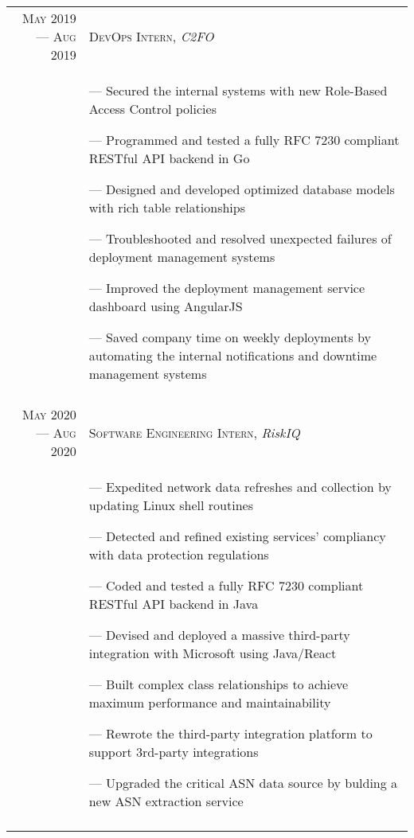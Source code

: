 \documentclass[a4paper, 10pt]{article}
\begin{document}
\begin{tabular}{r|p{12cm}}

	\textsc{May 2019 --- Aug 2019} & \textsc{DevOps Intern}, \emph{C2FO}                                                         \\&\footnotesize{
		--- Secured the internal systems with new Role-Based Access Control policies

		--- Programmed and tested a fully RFC 7230 compliant RESTful API backend in Go

		--- Designed and developed optimized database models with rich table relationships

		--- Troubleshooted and resolved unexpected failures of deployment management systems

		--- Improved the deployment management service dashboard using AngularJS

		--- Saved company time on weekly deployments by automating the internal notifications and downtime management systems
	}                                                                                                                            \\\multicolumn{2}{c}{}\\

	\textsc{May 2020 --- Aug 2020} & \textsc{Software Engineering Intern}, \emph{RiskIQ}                                         \\&\footnotesize{
		--- Expedited network data refreshes and collection by updating Linux shell routines

		--- Detected and refined existing services' compliancy with data protection regulations

		--- Coded and tested a fully RFC 7230 compliant RESTful API backend in Java

		--- Devised and deployed a massive third-party integration with Microsoft using Java/React

		--- Built complex class relationships to achieve maximum performance and maintainability

		--- Rewrote the third-party integration platform to support 3rd-party integrations

		--- Upgraded the critical ASN data source by bulding a new ASN extraction service
	}                                                                                                                            \\\multicolumn{2}{c}{}\\


\end{tabular}
\end{document}

